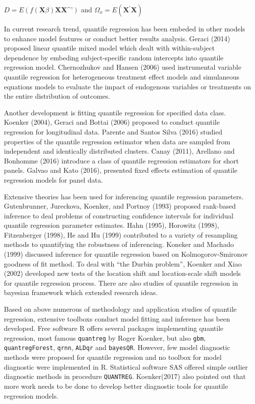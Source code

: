 \documentclass[11pt,a4paper,]{article}
\theoremstyle{definition}
\theoremstyle{definition}
\theoremstyle{remark}
\begin{document}
\(D=E(f(\textbf{X}\beta)\textbf{XX^{'}})\) and
\(\varOmega_{x}=E(\textbf{X}^{'}\textbf{X})\)

In current research trend, quantile regression has been embeded in other
models to enhance model features or conduct better results analysis.
Geraci (2014) proposed linear quantile mixed model which dealt with
within-subject dependence by embeding subject-specific random intercepts
into quantile regression model. Chernozhukov and Hansen (2006) used
instrumental variable quantile regression for heterogeneous treatment
effect models and simulaneous equations models to evaluate the impact of
endogenous variables or treatments on the entire distribution of
outcomes.

Another development is fitting quantile regression for specified data
class. Koenker (2004), Geraci and Bottai (2006) proposed to conduct
quantile regression for longitudinal data. Parente and Santos Silva
(2016) studied properties of the quantile regression estimator when data
are sampled from independent and identically distributed clusters. Canay
(2011), Arellano and Bonhomme (2016) introduce a class of quantile
regression estimators for short panels. Galvao and Kato (2016),
presented fixed effects estimation of quantile regression models for
panel data.

Extensive theories has been used for inferencing quantile regression
parameters. Gutenbrunner, Jureckova, Koenker, and Portnoy (1993)
proposed rank-based inference to deal problems of constructing
confidence intervals for individual quantile regression parameter
estimates. Hahn (1995), Horowitz (1998), Fitzenberger (1998), He and Hu
(1999) contributed to a variety of resampling methods to quantifying the
robustness of inferencing. Koneker and Machado (1999) discussed
inference for quantile regression based on Kolmogorov-Smironov goodness
of fit method. To deal with ``the Durbin problem'', Koenker and Xiao
(2002) developed new tests of the location shift and location-scale
shift models for quantile regression process. There are also studies of
quantile regression in bayesian framework which extended research ideas.

Based on above numerous of methodology and application studies of
quantile regression, extensive toolboxs conduct model fitting and
inference has been developed. Free software R offers several packages
implementing quantile regression, most famous \texttt{quantreg} by Roger
Koenker, but also \texttt{gbm}, \texttt{quantregForest}, \texttt{qrnn},
\texttt{ALDqr} and \texttt{bayesQR}. However, few model diagnostic
methods were proposed for quantile regression and no toolbox for model
diagnostic were implemented in R. Statistical software SAS offered
simple outlier diagnostic methods in procedure \texttt{QUANTREG}.
Koenker(2017) also pointed out that more work needs to be done to
develop better diagnostic tools for quantile regression models.
\end{document}
